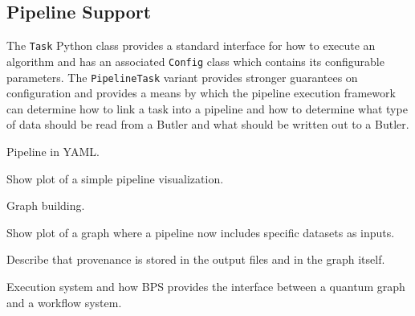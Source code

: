 \subsection{Pipeline Support}

The \texttt{Task} Python class provides a standard interface for how to execute an algorithm and has an associated \texttt{Config} class which contains its configurable parameters.
The \texttt{PipelineTask} variant provides stronger guarantees on configuration and provides a means by which the pipeline execution framework can determine how to link a task into a pipeline and how to determine what type of data should be read from a Butler and what should be written out to a Butler.

Pipeline in YAML.

Show plot of a simple pipeline visualization.

Graph building.

Show plot of a graph where a pipeline now includes specific datasets as inputs.

Describe that provenance is stored in the output files and in the graph itself.

Execution system and how BPS provides the interface between a quantum graph and a workflow system.
